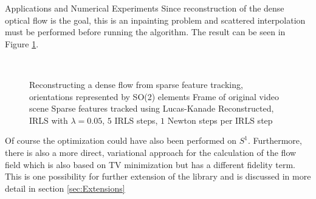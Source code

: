 \begin{chapter}{Applications and Numerical Experiments}
Since reconstruction of the dense optical flow is the goal, this is an inpainting problem and scattered interpolation must be performed before running the algorithm. The result can be seen in 
Figure \ref{fig:application_flowfield1}.
\begin{figure}[h!]
    \centering
    \\
    \caption[Dense optical flow reconstruction]{Reconstructing a dense flow from sparse feature tracking, orientations represented by SO(2) elements
	 Frame of original video scene 
	 Sparse features tracked using Lucas-Kanade
	 Reconstructed, IRLS with $\lambda=0.05$, $5$ IRLS steps, $1$ Newton steps per IRLS step
	\label{fig:application_flowfield1}
    }
\end{figure}

Of course the optimization could have also been performed on $S^1$. Furthermore, there is also a more direct, variational approach for the calculation of the flow field
which is also based on TV minimization but has a different fidelity term. This is one possibility for further extension of the library and is discussed in more detail in 
section \ref{sec:Extensions}


\end{chapter}
